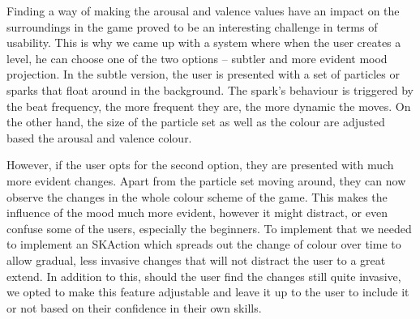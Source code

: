 Finding a way of making the arousal and valence values have an impact on the surroundings in the game proved to be an interesting challenge in terms of usability. This is why we came up with a system where when the user creates a level, he can choose one of the two options -- subtler and more evident mood projection. In the subtle version, the user is presented with a set of particles or sparks that float around in the background. The spark's behaviour is triggered by the beat frequency, the more frequent they are, the more dynamic the moves. On the other hand, the size of the particle set as well as the colour are adjusted based the arousal and valence colour.

However, if the user opts for the second option, they are presented with much more evident changes. Apart from the particle set moving around, they can now observe the changes in the whole colour scheme of the game. This makes the influence of the mood much more evident, however it might distract, or even confuse some of the users, especially the beginners. To implement that we needed to implement an SKAction which spreads out the change of colour over time to allow gradual, less invasive changes that will not distract the user to a great extend. In addition to this, should the user find the changes still quite invasive, we opted to make this feature adjustable and leave it up to the user to include it or not based on their confidence in their own skills. 



